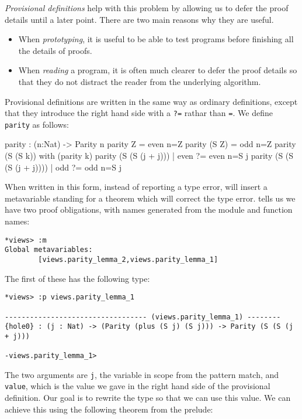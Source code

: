 \emph{Provisional definitions} help with this problem by allowing us to defer the
proof details until a later point. There are two main reasons why they are
useful.

\begin{itemize}
\item When \emph{prototyping}, it is useful to be able to test programs before
finishing all the details of proofs.  
\item When \emph{reading} a program, it is often much clearer to defer the proof
details so that they do not distract the reader from the underlying algorithm.
\end{itemize}

\noindent
Provisional definitions are written in the same way as ordinary definitions,
except that they introduce the right hand side with a \texttt{?=} rathar than
\texttt{=}. We define
\texttt{parity} as follows:

\begin{code}
parity : (n:Nat) -> Parity n
parity Z     = even {n=Z}
parity (S Z) = odd {n=Z}
parity (S (S k)) with (parity k)
  parity (S (S (j + j)))     | even ?= even {n=S j}
  parity (S (S (S (j + j)))) | odd  ?= odd {n=S j}
\end{code}

\noindent
When written in this form, instead of reporting a type error, \Idris{} will insert
a metavariable standing for a theorem which will correct the type error. \Idris{} 
tells us we have two proof obligations, with names generated from the module and
function names:

\begin{lstlisting}
*views> :m 
Global metavariables:
        [views.parity_lemma_2,views.parity_lemma_1]
\end{lstlisting}

\noindent
The first of these has the following type:

\begin{lstlisting}
*views> :p views.parity_lemma_1 

---------------------------------- (views.parity_lemma_1) --------
{hole0} : (j : Nat) -> (Parity (plus (S j) (S j))) -> Parity (S (S (j + j)))

-views.parity_lemma_1>  
\end{lstlisting}

\noindent
The two arguments are \texttt{j}, the variable in scope from the pattern match,
and \texttt{value}, which is the value we gave in the right hand side of the
provisional definition. Our goal is to rewrite the type so that we can use
this value.
We can achieve this using the following theorem from
the prelude:

